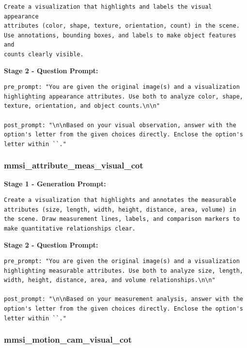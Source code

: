 \documentclass{article}
\theoremstyle{plain}
\theoremstyle{definition}
\theoremstyle{remark}
\begin{document}
\begin{verbatim}
Create a visualization that highlights and labels the visual appearance
attributes (color, shape, texture, orientation, count) in the scene.
Use annotations, bounding boxes, and labels to make object features and
counts clearly visible.
\end{verbatim}

\textbf{Stage 2 - Question Prompt:}

\begin{verbatim}
pre_prompt: "You are given the original image(s) and a visualization
highlighting appearance attributes. Use both to analyze color, shape,
texture, orientation, and object counts.\n\n"

post_prompt: "\n\nBased on your visual observation, answer with the
option's letter from the given choices directly. Enclose the option's
letter within ``."
\end{verbatim}

\subsubsection{mmsi\_attribute\_meas\_visual\_cot}

\textbf{Stage 1 - Generation Prompt:}

\begin{verbatim}
Create a visualization that highlights and annotates the measurable
attributes (size, length, width, height, distance, area, volume) in
the scene. Draw measurement lines, labels, and comparison markers to
make quantitative relationships clear.
\end{verbatim}

\textbf{Stage 2 - Question Prompt:}

\begin{verbatim}
pre_prompt: "You are given the original image(s) and a visualization
highlighting measurable attributes. Use both to analyze size, length,
width, height, distance, area, and volume relationships.\n\n"

post_prompt: "\n\nBased on your measurement analysis, answer with the
option's letter from the given choices directly. Enclose the option's
letter within ``."
\end{verbatim}

\subsubsection{mmsi\_motion\_cam\_visual\_cot}
\end{document}
